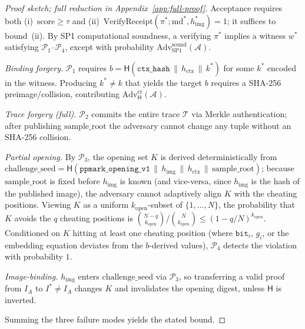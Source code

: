 \documentclass{article}
\theoremstyle{plain}
\theoremstyle{definition}
\theoremstyle{remark}
\begin{document}
\begin{proof}[Proof sketch; full reduction in Appendix~\ref{app:full-proof}]
Acceptance requires both (i)~$\mathrm{score} \geq \tau$ and (ii)~$\mathrm{VerifyReceipt}(\pi^*; \mathrm{md}^*, h_{\mathrm{img}}^*) = 1$; it suffices to bound~(ii). By SP1 computational soundness, a verifying $\pi^*$ implies a witness $w^*$ satisfying $\mathcal{P}_1$--$\mathcal{P}_4$, except with probability $\mathrm{Adv}^{\mathrm{sound}}_{\mathrm{SP1}}(\mathcal{A})$.

\emph{Binding forgery.} $\mathcal{P}_1$ requires $b = \mathsf{H}(\texttt{ctx\_hash}\,\|\,h_{\mathrm{ctx}}\,\|\,k^*)$ for some $k^*$ encoded in the witness. Producing $k^* \neq k$ that yields the target $b$ requires a SHA-256 preimage/collision, contributing $\mathrm{Adv}^{\mathrm{cr}}_{\mathsf{H}}(\mathcal{A})$.

\emph{Trace forgery (full).} $\mathcal{P}_2$ commits the entire trace $\mathcal{T}$ via Merkle authentication; after publishing $\mathrm{sample\_root}$ the adversary cannot change any tuple without an SHA-256 collision.

\emph{Partial opening.} By $\mathcal{P}_3$, the opening set $K$ is derived deterministically from $\mathrm{challenge\_seed} = \mathsf{H}(\texttt{ppmark\_opening\_v1}\,\|\,h_{\mathrm{img}}\,\|\,h_{\mathrm{ctx}}\,\|\,\mathrm{sample\_root})$; because $\mathrm{sample\_root}$ is fixed before $h_{\mathrm{img}}$ is known (and vice-versa, since $h_{\mathrm{img}}$ is the hash of the published image), the adversary cannot adaptively align $K$ with the cheating positions. Viewing $K$ as a uniform $k_{\mathrm{open}}$-subset of $\{1,\ldots,N\}$, the probability that $K$ avoids the $q$ cheating positions is $\binom{N-q}{k_{\mathrm{open}}}/\binom{N}{k_{\mathrm{open}}} \leq (1-q/N)^{k_{\mathrm{open}}}$. Conditioned on $K$ hitting at least one cheating position (where $\mathtt{bit}_i$, $g_i$, or the embedding equation deviates from the $b$-derived values), $\mathcal{P}_4$ detects the violation with probability $1$.

\emph{Image-binding.} $h_{\mathrm{img}}$ enters $\mathrm{challenge\_seed}$ via $\mathcal{P}_3$, so transferring a valid proof from $I_A$ to $I^* \neq I_A$ changes $K$ and invalidates the opening digest, unless $\mathsf{H}$ is inverted.

Summing the three failure modes yields the stated bound.
\end{proof}
\end{document}
